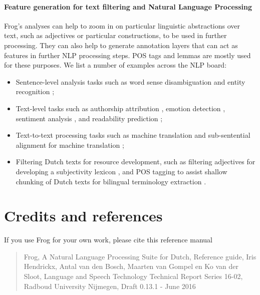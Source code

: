 \documentclass{book}
\begin{document}
\subsubsection{Feature generation for text filtering and Natural Language Processing}

Frog's analyses can help to zoom in on particular linguistic abstractions over text, such as adjectives or particular constructions, to be used in further processing. They can also help to generate annotation layers that can act as features in further NLP processing steps. POS tags and lemmas are mostly used for these purposes. We list a number of examples across the NLP board:

\begin{itemize}
\item Sentence-level analysis tasks such as word sense disambiguation \cite{VanGompel10} and entity recognition \cite{VandeCamp+11};
\item Text-level tasks such as authorship attribution \cite{luyckx2011scalability}, emotion detection \cite{vaassen2011automatic}, sentiment analysis \cite{hogenboom2014multi}, and readability prediction \cite{de2014using};
\item Text-to-text processing tasks such as machine translation \cite{Haque+11} and sub-sentential alignment for machine translation \cite{macken2010sub};
\item Filtering Dutch texts for resource development, such as filtering adjectives for developing a subjectivity lexicon \cite{de2012vreselijk}, and POS tagging to assist shallow chunking of Dutch texts for bilingual terminology extraction \cite{macken2013texsis}.
\end{itemize}

\chapter{Credits and references}
\label{ch-credit}
If you use Frog for your own work, please cite this reference manual
\begin{quotation} %
Frog, A Natural Language Processing Suite for Dutch, Reference guide, Iris Hendrickx, Antal van den Bosch, Maarten van Gompel en Ko van der Sloot, Language and Speech Technology Technical Report Series 16-02, Radboud University Nijmegen, Draft 0.13.1 - June 2016
\end{quotation}

\end{document}
